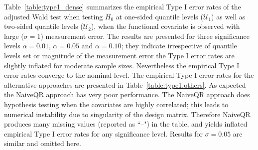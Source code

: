 \documentclass[times,sort&compress,3p]{elsarticle}
\theoremstyle{plain}%
\theoremstyle{definition}
\begin{document}
Table~\ref{table:type1_dense} summarizes the empirical Type I error rates of the adjusted Wald test when testing $H_0$ at one-sided quantile levels ($\mathcal{U}_1$) as well as two-sided quantile levels ($\mathcal{U}_2$), when the functional covariate is observed with large ($\sigma=1$) measurement error. The results are presented for three significance levels $\alpha=0.01$, $\alpha=0.05$ and $\alpha=0.10$; they indicate irrespective of quantile levels set or magnitude of the measurement error the Type I error rates are slightly inflated for moderate sample sizes. Nevertheless the empirical Type I error rates converge to the nominal level. The empirical Type I error rates for the alternative approaches are presented in Table~\ref{table:type1.others}. As expected the NaiveQR approach has very poor performance. The NaiveQR approach does hypothesis testing when the covariates are highly correlated; this leads to numerical instability due to singularity of the design matrix. Therefore NaiveQR produces many missing values (reported as ``--") in the table, and yields inflated empirical Type I error rates for any significance level. Results for $\sigma = 0.05$ are similar and omitted here. 
\end{document}
